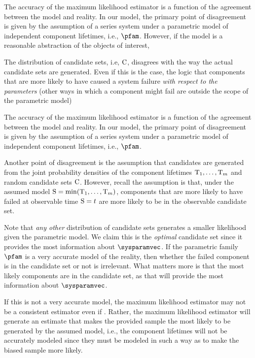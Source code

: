 \documentclass[ ../main.tex]{subfiles}
\begin{document}
The accuracy of the maximum likelihood estimator is a function of the agreement between the model and reality.
In our model, the primary point of disagreement is given by the assumption of a series system under a parametric model of independent component lifetimes, i.e., $\pfam$.
However, if the model is a reasonable abstraction of the objects of interest, 

The distribution of candidate sets, i.e, $\mathrm{C}$, disagrees with the way the actual candidate sets are generated.
	Even if this is the case, the logic that components that are more likely to have caused a system failure \emph{with respect to the parameters} (other ways in which a component might fail are outside the scope of the parametric model)


The accuracy of the maximum likelihood estimator is a function of the agreement between the model and reality.
In our model, the primary point of disagreement is given by the assumption of a series system under a parametric model of independent component lifetimes, i.e., $\pfam$.

Another point of disagreement is the assumption that candidates are generated from the joint probability densities of the component lifetimes $\mathrm{T}_1,\ldots,\mathrm{T}_m$ and random candidate sets $\mathrm{C}$.
However, recall the assumption is that, under the assumed model $\mathrm{S} = \min(\mathrm{T}_1,\ldots,\mathrm{T}_m)$, components that are more likely to have failed at observable time $\mathrm{S} = t$ are more likely to be in the observable candidate set.

Note that \emph{any other} distribution of candidate sets generates a smaller likelihood given the parametric model.
We claim this is the \emph{optimal} candidate set since it provides the most information about $\sysparamvec$.
If the parametric family $\pfam$ is a very accurate model of the reality, then whether the failed component is in the candidate set or not is irrelevant.
What matters more is that the most likely components are in the candidate set, as that will provide the most information about $\sysparamvec$.



If this is not a very accurate model, the maximum likelihood estimator may not be a consistent estimator even if .
Rather, the maximum likelihood estimator will generate an estimate that makes the provided sample the most likely to be generated by the assumed model, i.e., the component lifetimes will not be accurately modeled since they must be modeled in such a way as to make the biased sample more likely.
\end{document}
